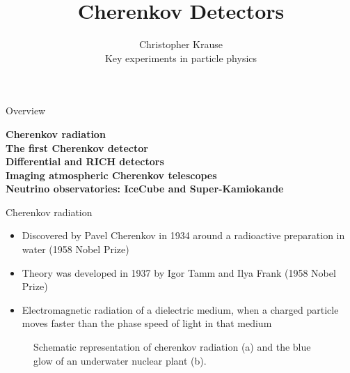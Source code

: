 \documentclass[aspectratio=1610, 10pt]{beamer}
\title{\Large{Cherenkov Detectors}}
\author[C.~Krause]{\normalsize{Christopher Krause \\
Key experiments in particle physics}}
\begin{document}
\maketitle

\begin{frame}{Overview}
  \begin{large}
    \Large \textbf{Cherenkov radiation} \\
    \vspace{0.5cm}
    \textbf{The first Cherenkov detector} \\
    \vspace{0.5cm}
    \textbf{Differential and RICH detectors} \\
    \vspace{0.5cm}
    \textbf{Imaging atmospheric Cherenkov telescopes} \\
    \vspace{0.5cm}
    \textbf{Neutrino observatories: IceCube and Super-Kamiokande} \\
\end{large}
\end{frame}

\begin{frame}{Cherenkov radiation}
  \begin{itemize}
    \item Discovered by Pavel Cherenkov in 1934 around a radioactive preparation in water (1958 Nobel Prize)
    \item Theory was developed in 1937 by Igor Tamm and Ilya Frank (1958 Nobel Prize)
    \item Electromagnetic radiation of a dielectric medium, when a charged particle moves
    faster than the phase speed of light in that medium
  \end{itemize}
  \begin{figure}
      \hspace{1cm}
  \caption{Schematic representation of cherenkov radiation (a) and the blue glow of an underwater nuclear plant (b).}
  \end{figure}
\end{frame}
\end{document}
